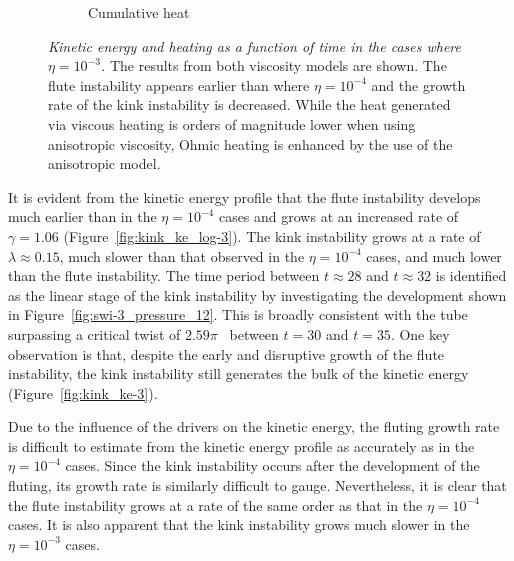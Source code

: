 \documentclass[fleqn,usenatbib]{mnras}
\newcommand{\rev}[1]{{\color{red} {#1}}}
\newcommand{\mycaption}[2]{\caption[#1]{\emph{#1} #2}}
\begin{document}
\begin{figure}
\begin{subfigure}{0.32\textwidth}
      \caption{Cumulative heat}
      \label{fig:heating_r-3}
    \end{subfigure}
\mycaption{Kinetic energy \rev{and heating} as a function of time in the cases where
$\eta=10^{-3}$.}{The results from both viscosity models are shown. The flute
instability appears earlier than where $\eta=10^{-4}$ and the growth rate of
the kink instability is decreased. \rev{While the heat generated via viscous heating is orders of magnitude lower when using anisotropic viscosity, Ohmic heating is enhanced by the use of the anisotropic model.}}
\label{fig:kink_str8_ke-3}%
\end{figure}

It is evident from the kinetic energy profile that the flute instability
develops much earlier than in the $\eta=10^{-4}$ cases and grows at an
increased rate of $\gamma = 1.06$ (Figure~\ref{fig:kink_ke_log-3}). The kink
instability grows at a rate of $\lambda \approx 0.15$, much slower than that
observed in the $\eta=10^{-4}$ cases, and much lower than the flute
instability. \rev{The time period between $t\approx28$ and $t\approx32$ is
identified as the linear stage of the kink instability by investigating the
development shown in Figure~\ref{fig:swi-3_pressure_12}. This is broadly consistent with the tube surpassing a critical twist of $2.59\pi$~\citep{hood1981,torok2003} between $t=30$ and $t=35$.} One key observation
is that, despite the early and disruptive growth of the flute instability, the
kink instability still generates the bulk of the kinetic energy
(Figure~\ref{fig:kink_ke-3}).

Due to the influence of the drivers on the kinetic energy, the fluting growth
rate is difficult to estimate from the kinetic energy profile as accurately as
in the $\eta=10^{-4}$ cases. Since the kink instability occurs after the
development of the fluting, its growth rate is similarly difficult to gauge.
Nevertheless, it is clear that the flute instability grows at a rate of the
same order as that in the $\eta=10^{-4}$ cases. It is also apparent that the
kink instability grows much slower in the $\eta=10^{-3}$ cases.
\end{document}
